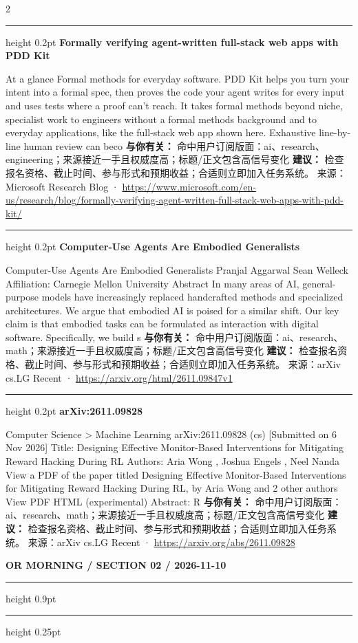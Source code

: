 \documentclass[10.5pt]{ctexart}
\begin{document}
\begin{multicols}{2}
\vspace{2mm}
\hrule height 0.2pt
\vspace{2mm}
{\large\bfseries Formally verifying agent-written full-stack web apps with PDD Kit}\par
At a glance Formal methods for everyday software. PDD Kit helps you turn your intent into a formal spec, then proves the code your agent writes for every input and uses tests where a proof can’t reach. It takes formal methods beyond niche, specialist work to engineers without a formal methods background and to everyday applications, like the full-stack web app shown here. Exhaustive line-by-line human review can beco
\textbf{与你有关：} 命中用户订阅版面：ai、research、engineering；来源接近一手且权威度高；标题/正文包含高信号变化
\textbf{建议：} 检查报名资格、截止时间、参与形式和预期收益；合适则立即加入任务系统。
{\footnotesize\color{ormuted} 来源：Microsoft Research Blog · \url{https://www.microsoft.com/en-us/research/blog/formally-verifying-agent-written-full-stack-web-apps-with-pdd-kit/}}
\vspace{2mm}
\hrule height 0.2pt
\vspace{2mm}
{\large\bfseries Computer-Use Agents Are Embodied Generalists}\par
Computer-Use Agents Are Embodied Generalists Pranjal Aggarwal Sean Welleck Affiliation: Carnegie Mellon University Abstract In many areas of AI, general-purpose models have increasingly replaced handcrafted methods and specialized architectures. We argue that embodied AI is poised for a similar shift. Our key claim is that embodied tasks can be formulated as interaction with digital software. Specifically, we build s
\textbf{与你有关：} 命中用户订阅版面：ai、research、math；来源接近一手且权威度高；标题/正文包含高信号变化
\textbf{建议：} 检查报名资格、截止时间、参与形式和预期收益；合适则立即加入任务系统。
{\footnotesize\color{ormuted} 来源：arXiv cs.LG Recent · \url{https://arxiv.org/html/2611.09847v1}}
\vspace{2mm}
\hrule height 0.2pt
\vspace{2mm}
{\large\bfseries arXiv:2611.09828}\par
Computer Science > Machine Learning arXiv:2611.09828 (cs) [Submitted on 6 Nov 2026] Title: Designing Effective Monitor-Based Interventions for Mitigating Reward Hacking During RL Authors: Aria Wong , Joshua Engels , Neel Nanda View a PDF of the paper titled Designing Effective Monitor-Based Interventions for Mitigating Reward Hacking During RL, by Aria Wong and 2 other authors View PDF HTML (experimental) Abstract: R
\textbf{与你有关：} 命中用户订阅版面：ai、research、math；来源接近一手且权威度高；标题/正文包含高信号变化
\textbf{建议：} 检查报名资格、截止时间、参与形式和预期收益；合适则立即加入任务系统。
{\footnotesize\color{ormuted} 来源：arXiv cs.LG Recent · \url{https://arxiv.org/abs/2611.09828}}
\end{multicols}
\newpage
{\small\bfseries OR MORNING / SECTION 02 / 2026-11-10}
\vspace{2mm}
\hrule height 0.9pt
\vspace{1.5mm}
\hrule height 0.25pt
\vspace{4mm}
\end{document}
